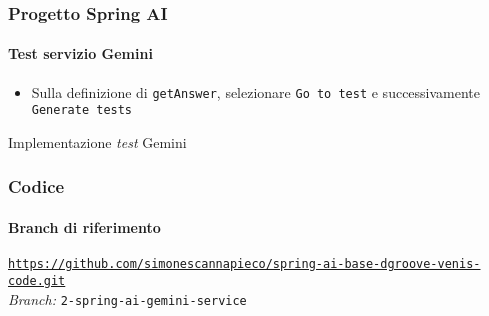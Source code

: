 %
\begin{frame}[t,fragile] \frametitle{Progetto Spring AI}
    \framesubtitle{Test servizio Gemini}
    \begin{itemize}
        \item[\alertedcircled{1}] Sulla definizione di \texttt{getAnswer}, selezionare \texttt{Go to test} e successivamente \texttt{Generate tests}
    \end{itemize}
        \begin{block}{Implementazione \textit{test} Gemini}
{\tiny}
    \end{block}
\end{frame}
%
\begin{frame}[fragile] \frametitle{Codice}
    \framesubtitle{Branch di riferimento}
	\begin{center}
		{\scriptsize \href{https://github.com/simonescannapieco/spring-ai-base-dgroove-venis-code.git}{\texttt{https://github.com/simonescannapieco/spring-ai-base-dgroove-venis-code.git}}}\\
		\textit{Branch:} \alert{\texttt{2-spring-ai-gemini-service}}
	\end{center}
\end{frame}